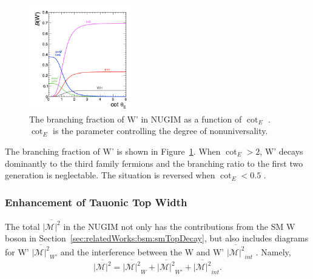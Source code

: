 \begin{figure}[ht]
    \centering
    \includegraphics[width=0.4\textwidth]{chapters/RelatedWorks/sectionBSM/figures/WPDecayBr.png}
    \caption{The branching fraction of W' in NUGIM as a function of $\cot_E$ \cite{Sirunyan:2018lbg}. $\cot_E$ is the parameter controlling the degree of nonuniversality.}
    \label{fig:relatedWorks:bsm:WPrime:braching}
\end{figure}



\noindent The branching fraction of W' is shown in Figure~\ref{fig:relatedWorks:bsm:WPrime:braching}. When $\cot_E > 2$, W' decays dominantly to the third family fermions and the branching ratio to the first two generation is neglectable. The situation is reversed when $\cot_E<0.5$ .


\subsubsection{Enhancement of Tauonic Top Width}

The total $\overline{ |\mathcal{M}|^2 }$ in the NUGIM not only has the contributions from the SM W boson in Section~\ref{sec:relatedWorks:bsm:smTopDecay}, but also includes diagrams for W' $\overline{ |\mathcal{M}|^2 } _{W'} $  and the interference between the W and W' $\overline{ |\mathcal{M}|^2 } _{int} $ . Namely,
\begin{equation}
	\overline{ |\mathcal{M}|^2 }  = \overline{ |\mathcal{M}|^2 } _{W} +  \overline{ |\mathcal{M}|^2 } _{W'} +  \overline{ |\mathcal{M}|^2 } _{int} .
\end{equation}

